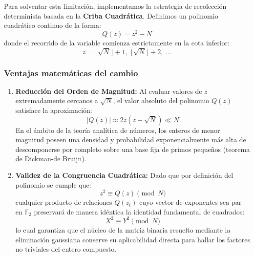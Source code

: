 Para solventar esta limitación, implementamos la estrategia de recolección determinista basada en la \textbf{Criba Cuadrática}. Definimos un polinomio cuadrático continuo de la forma:
\[
Q(z) = z^2 - N
\]
donde el recorrido de la variable comienza estrictamente en la cota inferior:
\[
z = \lfloor\sqrt{N}\rfloor + 1, \; \lfloor\sqrt{N}\rfloor + 2, \; \dots
\]

\subsubsection*{Ventajas matemáticas del cambio}

\begin{enumerate}
    \item \textbf{Reducción del Orden de Magnitud:} Al evaluar valores de $z$ extremadamente cercanos a $\sqrt{N}$, el valor absoluto del polinomio $Q(z)$ satisface la aproximación:
    \[
    |Q(z)| \approx 2z\left(z - \sqrt{N}\right) \ll N
    \]
    En el ámbito de la teoría analítica de números, los enteros de menor magnitud poseen una densidad y probabilidad exponencialmente más alta de descomponerse por completo sobre una base fija de primos pequeños (teorema de Dickman-de Bruijn).
    
    \item \textbf{Validez de la Congruencia Cuadrática:} Dado que por definición del polinomio se cumple que:
    \[
    z^2 \equiv Q(z) \pmod{N}
    \]
    cualquier producto de relaciones $Q(z_i)$ cuyo vector de exponentes sea par en $\mathbb{F}_2$ preservará de manera idéntica la identidad fundamental de cuadrados:
    \[
    X^2 \equiv Y^2 \pmod{N}
    \]
    lo cual garantiza que el núcleo de la matriz binaria resuelto mediante la eliminación gaussiana conserve su aplicabilidad directa para hallar los factores no triviales del entero compuesto.
\end{enumerate}

